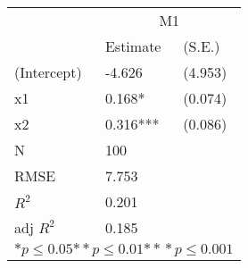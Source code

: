 \begin{tabular}{*{3}{l}}
\hline
                  & \multicolumn{2}{c}{M1}   \tabularnewline
                   &Estimate  &(S.E.)  \tabularnewline
 \hline
 \hline
   (Intercept)     &-4.626   &   (4.953) \tabularnewline
   x1              &0.168*   &   (0.074) \tabularnewline
   x2              &0.316***   &   (0.086) \tabularnewline
 \hline
 N                 &100       &        \tabularnewline
 RMSE             &7.753         & \tabularnewline
 $R^2$             &0.201         & \tabularnewline
 adj $R^2$         &0.185         & \tabularnewline
 \hline
\hline
 
 \multicolumn{3}{c}{${*  p}\le 0.05$${*\!\!*  p}\le 0.01$${*\!\!*\!\!*  p}\le 0.001$}\tabularnewline
 \end{tabular}